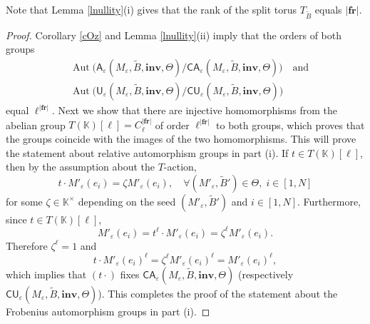 \documentclass[11pt]{amsart}
\theoremstyle{plain}
\newcommand \leref[1]{Lemma \ref{l#1}}
\newcommand \coref[1]{Corollary \ref{c#1}}
\def \KK {{\mathbb C}}
\def \KK {{\mathbb K}}
\def \A {{\boldsymbol{\mathsf A}}}
\def \C {{\boldsymbol{\mathsf C}}}
\def \U {{\boldsymbol{\mathsf U}}}
\def \B  {{\widetilde{B}}}
\newcommand \fr {{\mathbf{fr}}}
\newcommand \inv {{\mathbf{inv}}}
\def \ep {\varepsilon}
\DeclareMathOperator \Aut { {\mathrm{Aut}} }
\begin{document}

Note that \leref{nullity}(i) gives that the rank of the split torus $T_{\B}$ equals $|\fr|$.

\begin{proof} \coref{Oz} and \leref{nullity}(ii) imply that the orders of both groups 
\begin{align*}
&\Aut\big(\A_\ep(M_\ep, \B, \inv, \Theta)/
\C\A_\ep(M_\ep, \B, \inv, \Theta) \big) \quad \mbox{and}
\\
&\Aut \big(
\U_\ep(M_\ep, \B, \inv, \Theta)/
\C\U_\ep(M_\ep, \B, \inv, \Theta) \big)
\end{align*}
equal $\ell^{|\fr|}$.
Next we show that there are injective homomorphisms from the abelian group $T(\KK)[\ell] = C_\ell^{|\fr|}$ of order $\ell^{|\fr|}$ to both groups, which proves that the groups coincide with the images of the two homomorphisms. This will prove the statement about relative automorphism groups in part (i). If $t \in T(\KK)[\ell]$, then by the assumption about the $T$-action,
\[
t \cdot M'_\ep(e_i) = \zeta M'_\ep(e_i), \quad 
\forall (M'_\ep, \B') \in \Theta, \; i \in [1,N]
\]
for some $\zeta \in \KK^\times$ depending on the seed 
$(M'_\ep, \B')$ and $i \in [1,N]$.
Furthermore, since $t \in T(\KK)[\ell]$, 
\[
M'_\ep(e_i) = t^\ell \cdot M'_\ep(e_i) = \zeta^\ell M'_\ep(e_i).
\]
Therefore $\zeta^\ell =1$ and
\[
t \cdot M'_\ep(e_i)^\ell  = \zeta^\ell M'_\ep(e_i)^\ell = M'_\ep(e_i)^\ell,
\]
which implies that $(t \cdot)$ fixes 
$\C\A_\ep(M_\ep, \B, \inv, \Theta)$
(respectively $\C\U_\ep(M_\ep, \B, \inv, \Theta)$). This completes the proof of the statement about the Frobenius automorphism groups in part (i). 


\end{proof}
\end{document}
